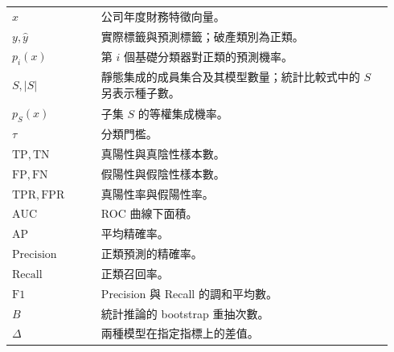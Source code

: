 \clearpage
{}
\noindent
\begin{tabular}{@{}p{0.22\linewidth}p{0.72\linewidth}@{}}
\(x\) & 公司年度財務特徵向量。\\
\(y,\hat y\) & 實際標籤與預測標籤；破產類別為正類。\\
\(p_i(x)\) & 第 \(i\) 個基礎分類器對正類的預測機率。\\
\(S,|S|\) & 靜態集成的成員集合及其模型數量；統計比較式中的 \(S\) 另表示種子數。\\
\(p_S(x)\) & 子集 \(S\) 的等權集成機率。\\
\(\tau\) & 分類門檻。\\
\(\mathrm{TP},\mathrm{TN}\) & 真陽性與真陰性樣本數。\\
\(\mathrm{FP},\mathrm{FN}\) & 假陽性與假陰性樣本數。\\
\(\mathrm{TPR},\mathrm{FPR}\) & 真陽性率與假陽性率。\\
\(\mathrm{AUC}\) & ROC 曲線下面積。\\
\(\mathrm{AP}\) & 平均精確率。\\
\(\mathrm{Precision}\) & 正類預測的精確率。\\
\(\mathrm{Recall}\) & 正類召回率。\\
\(\mathrm{F1}\) & Precision 與 Recall 的調和平均數。\\
\(B\) & 統計推論的 bootstrap 重抽次數。\\
\(\Delta\) & 兩種模型在指定指標上的差值。\\
\end{tabular}
